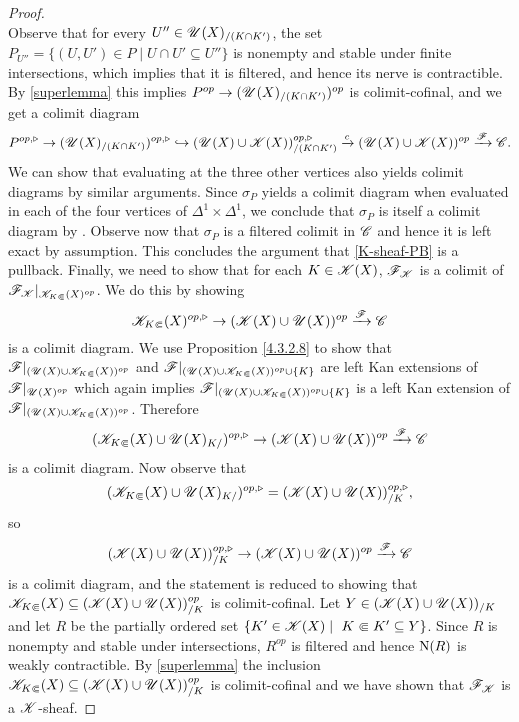 \documentclass[../../thesis.tex]{subfiles}
\begin{document}
\begin{proof}
\[    \]
    Observe that for every $U'' \in \mathscr{U}(X)_{/(K\cap K')}$, the set
    $P_{U''} = \{(U,U') \in P \mid U\cap U' \subseteq U''\}$ is nonempty and stable under finite intersections, which implies that it is filtered, and hence its nerve is contractible.
    By \ref{superlemma} this implies $P^{op} \to (\mathscr{U}(X)_{/(K\cap K')})^{op}$ is colimit-cofinal, and we get a colimit diagram
    \[
        P^{op,\triangleright} \to(\mathscr{U}(X)_{/(K\cap K')})^{op,\triangleright} \hookrightarrow (\mathscr{U}(X) \cup \mathscr{K}(X))_{/(K\cap K')}^{op,\triangleright} \xrightarrow{c} (\mathscr{U}(X) \cup \mathscr{K}(X))^{op} \xrightarrow{\mathscr{F}}\mathscr{C}.
    \]
    We can show that evaluating at the three other vertices also yields colimit diagrams by similar arguments.
    Since $\sigma_P$ yields a colimit diagram when evaluated in each of the four vertices of $\Delta^1 \times \Delta^1$, we conclude that $\sigma_P$ is itself a colimit diagram by \cite[Proposition 5.1.2.2]{HTT}.
    Observe now that $\sigma_P$ is a filtered colimit in $\mathscr{C}$ and hence it is left exact by assumption.
    This concludes the argument that \ref{K-sheaf-PB} is a pullback.
    Finally, we need to show that for each $K \in \mathscr{K}(X)$, $\mathscr{F}_{\mathscr{K}}$ is a colimit of $\mathscr{F}_{\mathscr{K}}|_{\mathscr{K}_{K\Subset}(X)^{op}}$.
    We do this by showing
    \[
        \mathscr{K}_{K\Subset}(X)^{op,\triangleright} \to (\mathscr{K}(X) \cup \mathscr{U}(X))^{op} \xrightarrow{\mathscr{F}} \mathscr{C}
    \]
    is a colimit diagram.
    We use Proposition \ref{4.3.2.8} to show that
    $\mathscr{F}|_{(\mathscr{U}(X) \cup \mathscr{K}_{K\Subset}(X))^{op}}$ and ${\mathscr{F}|_{(\mathscr{U}(X) \cup \mathscr{K}_{K\Subset}(X))^{op} \cup \{K\}}}$ are left Kan extensions of $\mathscr{F}|_{\mathscr{U}(X)^{op}}$ which again implies $\mathscr{F}|_{(\mathscr{U}(X) \cup \mathscr{K}_{K\Subset}(X))^{op} \cup \{K\}}$ is a left Kan extension of $\mathscr{F}|_{(\mathscr{U}(X) \cup \mathscr{K}_{K\Subset}(X))^{op}}$.
    Therefore
    \[
        (\mathscr{K}_{K\Subset}(X) \cup \mathscr{U}(X)_{K/})^{op,\triangleright} \to (\mathscr{K}(X) \cup \mathscr{U}(X))^{op} \xrightarrow{\mathscr{F}} \mathscr{C}
    \]
    is a colimit diagram.
    Now observe that
    \[
        (\mathscr{K}_{K\Subset}(X) \cup \mathscr{U}(X)_{K/})^{op,\triangleright} = (\mathscr{K}(X) \cup \mathscr{U}(X))^{op,\triangleright}_{/K},
    \]
    so
    \[
        (\mathscr{K}(X) \cup \mathscr{U}(X))^{op,\triangleright}_{/K} \to (\mathscr{K}(X) \cup \mathscr{U}(X))^{op} \xrightarrow{\mathscr{F}} \mathscr{C}
    \]
    is a colimit diagram, and the statement is reduced to showing that $\mathscr{K}_{K\Subset}(X) \subseteq (\mathscr{K}(X) \cup \mathscr{U}(X))_{/K}^{op}$ is colimit-cofinal.
    Let $Y\in (\mathscr{K}(X) \cup \mathscr{U}(X))_{/K}$ and let $R$ be the partially ordered set $\{K' \in \K(X) \mid K \Subset K ' \subseteq Y\}$.
    Since $R$ is nonempty and stable under intersections, $R^{op}$ is filtered and hence $\mathrm{N}(R)$ is weakly contractible.
    By \ref{superlemma} the inclusion $\mathscr{K}_{K\Subset}(X) \subseteq (\mathscr{K}(X) \cup \mathscr{U}(X))_{/K}^{op}$ is colimit-cofinal and we have shown that $\mathscr{F}_{\mathscr{K}}$ is a $\mathscr{K}$-sheaf.
\end{proof}
\end{document}
